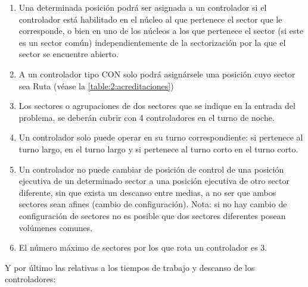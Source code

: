 \begin{enumerate}[resume*]
	\item \label{RD:acreditacion-valida} Una determinada posición podrá ser asignada a un controlador si el controlador está habilitado en el núcleo al que pertenece el sector que le corresponde, o bien en uno de los núcleos a los que pertenece el sector
	(si este es un sector común) independientemente de la sectorización por la que el sector se encuentre abierto.
	
	\item A un controlador tipo CON solo podrá asignársele una posición cuyo sector sea Ruta (véase la \autoref{table:2:acreditaciones})
	
	\item Los sectores o agrupaciones de dos sectores que se indique en la entrada del problema, se deberán cubrir con 4 controladores en el turno	de noche.

	\item Un controlador solo puede operar en su turno correspondiente: si pertenece al turno largo, en el turno largo y si pertenece al turno corto en el turno corto.

	\item Un controlador no puede cambiar de posición de control de una posición ejecutiva de un determinado sector a una posición ejecutiva de otro sector diferente, sin que exista un descanso entre medias, a no ser que ambos sectores sean afines (cambio de configuración). Nota: si no hay cambio de configuración de sectores no es posible que dos sectores diferentes posean volúmenes comunes.
	
	\item El número máximo de sectores por los que rota un controlador es 3.	
\end{enumerate}



Y por último las relativas a los tiempos de trabajo y descanso de los controladores:

